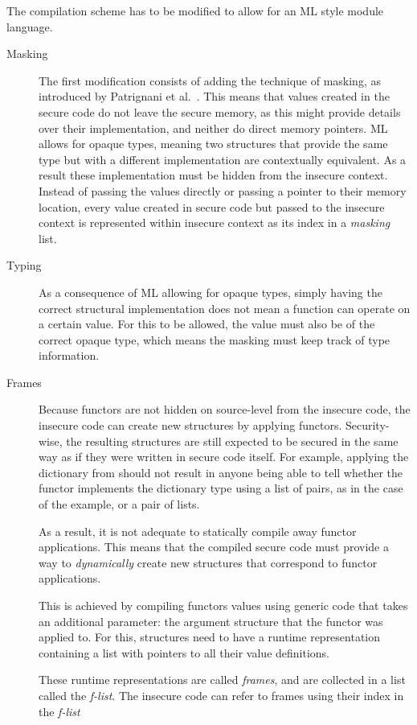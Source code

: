 \documentclass[11pt]{article}
\begin{document}
The compilation scheme has to be modified to allow for an ML style module language.
\begin{description}
\item[Masking] The first modification consists of adding the technique of masking, as introduced by Patrignani et al.~\cite{Patrignani}.
This means that values created in the secure code do not leave the secure memory, as this might provide details over their implementation, and neither do direct memory pointers.
ML allows for opaque types, meaning two structures that provide the same type but with a different implementation are contextually equivalent. 
As a result these implementation must be hidden from the insecure context.
Instead of passing the values directly or passing a pointer to their memory location, every value created in secure code but passed to the insecure context is represented within insecure context as its index in a \emph{masking} list.

\item[Typing]
As a consequence of ML allowing for opaque types, simply having the correct structural implementation does not mean a function can operate on a certain value.
For this to be allowed, the value must also be of the correct opaque type, which means the masking must keep track of type information.

\item[Frames]
Because functors are not hidden on source-level from the insecure code, the insecure code can create new structures by applying functors.
Security-wise, the resulting structures are still expected to be secured in the same way as if they were written in secure code itself.
For example, applying the dictionary from  should not result in anyone being able to tell whether the functor implements the dictionary type using a list of pairs, as in the case of the example, or a pair of lists.

As a result, it is not adequate to statically compile away functor applications.
This means that the compiled secure code must provide a way to \emph{dynamically} create new structures that correspond to functor applications.

This is achieved by compiling functors values using generic code that takes an additional parameter: the argument structure that the functor was applied to.
For this, structures need to have a runtime representation containing a list with pointers to all their value definitions.

These runtime representations are called \emph{frames}, and are collected in a list called the \emph{f-list}.
The insecure code can refer to frames using their index in the \emph{f-list}


\end{description}
\end{document}
